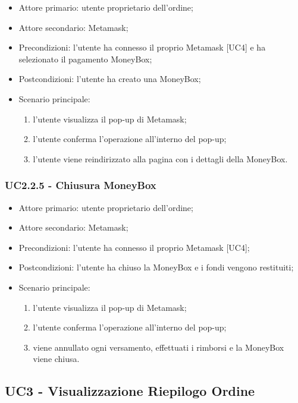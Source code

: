     \begin{itemize}
        \item Attore primario: utente proprietario dell'ordine;
        \item Attore secondario: Metamask;
        \item Precondizioni: l'utente ha connesso il proprio Metamask [UC4] e ha selezionato il pagamento MoneyBox;
        \item Postcondizioni: l'utente ha creato una MoneyBox;
        \item Scenario principale:
        \begin{enumerate}
            \item l'utente visualizza il pop-up di Metamask;
            \item l'utente conferma l'operazione all'interno del pop-up;
            \item l'utente viene reindirizzato alla pagina con i dettagli della MoneyBox.
        \end{enumerate}
        \end{itemize}

    \subsubsection{UC2.2.5 - Chiusura MoneyBox}

    \begin{itemize}
    \item Attore primario: utente proprietario dell'ordine;
    \item Attore secondario: Metamask;
    \item Precondizioni: l'utente ha connesso il proprio Metamask [UC4];
    \item Postcondizioni: l'utente ha chiuso la MoneyBox e i fondi vengono restituiti;
    \item Scenario principale:
    \begin{enumerate}
        \item l'utente visualizza il pop-up di Metamask;
        \item l'utente conferma l'operazione all'interno del pop-up;
        \item viene annullato ogni versamento, effettuati i rimborsi e la MoneyBox viene chiusa.
    \end{enumerate}
    \end{itemize}

\subsection{UC3 - Visualizzazione Riepilogo Ordine}

